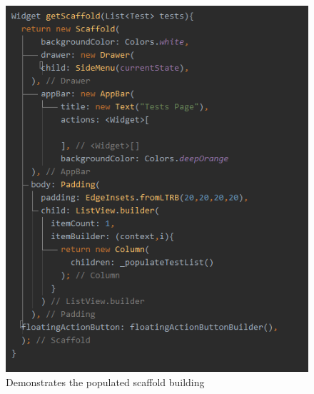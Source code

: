 \documentclass[onecolumn, draftclsnofoot,10pt, compsoc]{IEEEtran}
\begin{document}
\begin{figure}[!htb]
    \centering
    \includegraphics[scale=0.5]{Images/Capture4.PNG}
    \caption{ Demonstrates the populated scaffold building}
\end{figure}
\newpage
\end{document}
